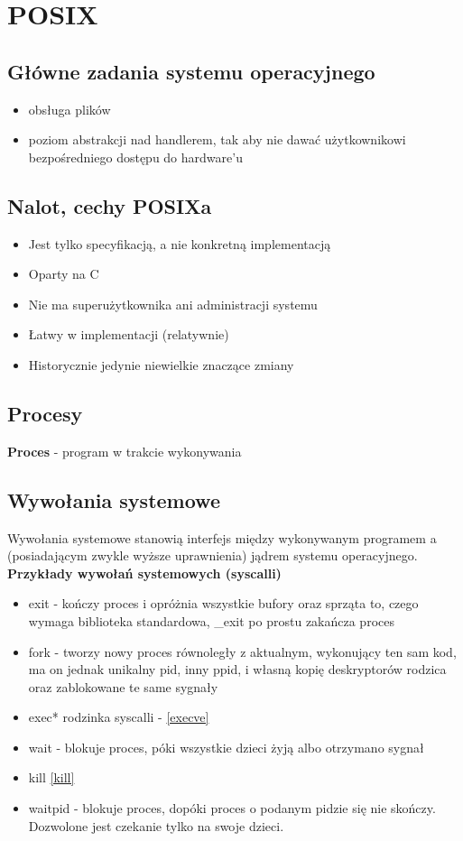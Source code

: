 \documentclass[12pt, a4paper, polish, openany]{book}
\begin{document}
\onehalfspacing

\fancyhead[C]{\thepage}
\tableofcontents

\chapter{POSIX}
\section{Główne zadania systemu operacyjnego}
\begin{itemize}
  \item obsługa plików
  \item poziom abstrakcji nad handlerem, tak aby nie dawać użytkownikowi bezpośredniego dostępu do hardware'u
\end{itemize}
\section{Nalot, cechy POSIXa}
\begin{itemize}
  \item Jest tylko specyfikacją, a nie konkretną implementacją
  \item Oparty na C
  \item Nie ma superużytkownika ani administracji systemu
  \item Łatwy w implementacji (relatywnie)
  \item Historycznie jedynie niewielkie znaczące zmiany
\end{itemize}
\section{Procesy}
\textbf{Proces} - program w trakcie wykonywania
\section{Wywołania systemowe}
Wywołania systemowe stanowią interfejs między wykonywanym programem a (posiadającym zwykle wyższe uprawnienia) jądrem systemu operacyjnego.\\
\textbf{Przykłady wywołań systemowych (syscalli)}
\begin{itemize}
  \item exit - kończy proces i opróżnia wszystkie bufory oraz sprząta to, czego wymaga biblioteka standardowa, \_exit po prostu zakańcza proces
  \item fork - tworzy nowy proces równoległy z aktualnym, wykonujący ten sam kod, ma on jednak unikalny pid, inny ppid, i własną kopię deskryptorów rodzica oraz zablokowane te same sygnały
  \item exec* rodzinka syscalli - \ref{execve}
  \item wait - blokuje proces, póki wszystkie dzieci żyją albo otrzymano sygnał
  \item kill \ref{kill}
  \item waitpid - blokuje proces, dopóki proces o podanym pidzie się nie skończy. Dozwolone jest czekanie tylko na swoje dzieci.
\end{itemize}
\end{document}
